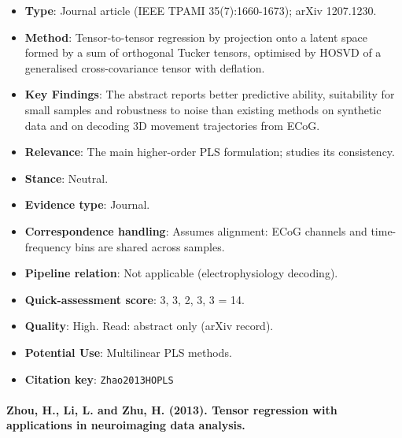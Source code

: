 \documentclass[journal,onecolumn]{IEEEtran}
\begin{document}
\begin{itemize}

\item{} \textbf{Type}: Journal article (IEEE TPAMI 35(7):1660-1673); arXiv 1207.1230.

\item{} \textbf{Method}: Tensor-to-tensor regression by projection onto a latent space formed by a sum of orthogonal Tucker tensors, optimised by HOSVD of a generalised cross-covariance tensor with deflation.

\item{} \textbf{Key Findings}: The abstract reports better predictive ability, suitability for small samples and robustness to noise than existing methods on synthetic data and on decoding 3D movement trajectories from ECoG.

\item{} \textbf{Relevance}: The main higher-order PLS formulation; \cite{Park2026Sparse} studies its consistency.

\item{} \textbf{Stance}: Neutral.

\item{} \textbf{Evidence type}: Journal.

\item{} \textbf{Correspondence handling}: Assumes alignment: ECoG channels and time-frequency bins are shared across samples.

\item{} \textbf{Pipeline relation}: Not applicable (electrophysiology decoding).

\item{} \textbf{Quick-assessment score}: 3, 3, 2, 3, 3 = 14.

\item{} \textbf{Quality}: High. Read: abstract only (arXiv record).

\item{} \textbf{Potential Use}: Multilinear PLS methods.

\item{} \textbf{Citation key}: \texttt{Zhao2013HOPLS}

\end{itemize}

\paragraph{Zhou, H., Li, L. and Zhu, H. (2013). Tensor regression with applications in neuroimaging data analysis.~\cite{Zhou2013Tensor}}\mbox{}
\end{document}
